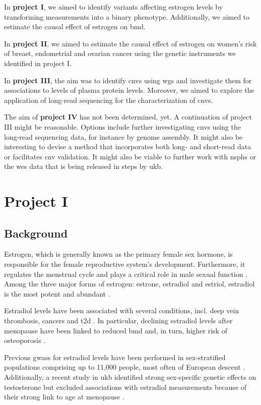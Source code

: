 \documentclass[draft]{scrbook}
\begin{document}
In \textbf{project I}, we aimed to identify variants affecting estrogen levels by transforming measurements into a binary phenotype.
Additionally, we aimed to estimate the causal effect of estrogen on \gls{bmd}.

In \textbf{project II}, we aimed to estimate the causal effect of estrogen on women's risk of breast, endometrial and ovarian cancer using the genetic instruments we identified in project I.

In \textbf{project III}, the aim was to identify \glspl{cnv} using \gls{wgs} and investigate them for associations to levels of plasma protein levels.
Moreover, we aimed to explore the application of long-read sequencing for the characterization of \glspl{cnv}.

The aim of \textbf{project IV} has not been determined, yet.
A continuation of project III might be reasonable.
Options include further investigating \glspl{cnv} using the long-read sequencing data, for instance by genome assembly.
It might also be interesting to devise a method that incorporates both long- and short-read data or facilitates \gls{cnv} validation.
It might also be viable to further work with \gls{nsphs} or the \gls{wes} data that is being released in steps by \gls{ukb}.

\chapter{Project I}

\section{Background}
Estrogen, which is generally known as the primary female sex hormone, is responsible for the female reproductive system's development.
Furthermore, it regulates the menstrual cycle and plays a critical role in male sexual function \cite{Bates2013b,Hess1997b}. 
Among the three major forms of estrogen: estrone, estradiol and estriol, estradiol is the most potent and abundant \cite{Thomas2013c}.

Estradiol levels have been associated with several conditions, incl. deep vein thrombosis, cancers and \gls{t2d} \cite{Cauley1999a, Rosendaal2003b,Vikan2010}.
In particular, declining estradiol levels after menopause have been linked to reduced \gls{bmd} and, in turn, higher risk of osteoporosis \cite{Riggs1998a,Longo2012a}.

Previous \glspl{gwas} for estradiol levels have been performed in sex-stratified populations comprising up to 11,000 people, most often of European descent \cite{Pott2019e,Chen2013d,Liu2013b,Prescott2012f,Eriksson2018b}.
Additionally, a recent study in \gls{ukb} identified strong sex-specific genetic effects on testosterone but excluded associations with estradiol measurements because of their strong link to age at menopause \cite{Ruth2020d}.
\end{document}
